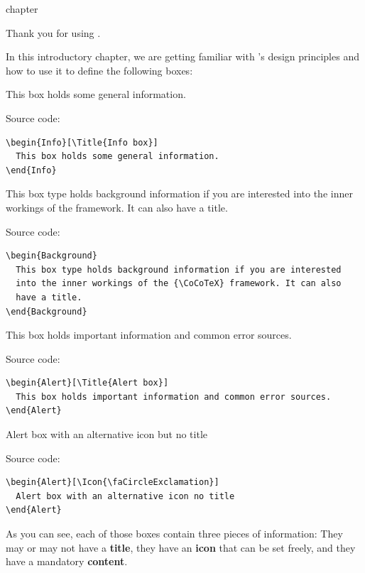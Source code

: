\begin{Heading}{chapter}
\end{Heading}

Thank you for using \CoCoTeX.

In this introductory chapter, we are getting familiar with \CoCoTeX's
design principles and how to use it to define the following boxes:

\begin{Info}
  This box holds some general information.
\end{Info}

Source code:
\begin{lstlisting}
\begin{Info}[\Title{Info box}]
  This box holds some general information.
\end{Info}
\end{lstlisting}

\begin{Background}
  This box type holds background information if you are interested
  into the inner workings of the {\CoCoTeX} framework. It can also
  have a title.
\end{Background}

Source code:
\begin{lstlisting}
\begin{Background}
  This box type holds background information if you are interested
  into the inner workings of the {\CoCoTeX} framework. It can also
  have a title.
\end{Background}
\end{lstlisting}

\begin{Alert}
  This box holds important information and common error sources.
\end{Alert}

Source code:
\begin{lstlisting}
\begin{Alert}[\Title{Alert box}]
  This box holds important information and common error sources.
\end{Alert}
\end{lstlisting}

\begin{Alert}[\Icon{\faCircleExclamation}]
  Alert box with an alternative icon but no title
\end{Alert}

Source code:
\begin{lstlisting}
\begin{Alert}[\Icon{\faCircleExclamation}]
  Alert box with an alternative icon no title
\end{Alert}
\end{lstlisting}
As you can see, each of those boxes contain three pieces of
information: They may or may not have a \textbf{title}, they have an
\textbf{icon} that can be set freely, and they have a mandatory
\textbf{content}.


